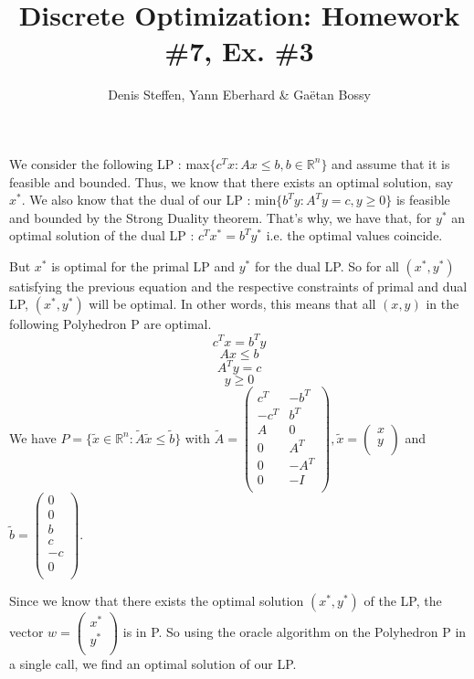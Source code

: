 \documentclass[a4paper,11pt,french]{article}
\title{Discrete Optimization: Homework \#7, Ex. \#3}
\author{Denis Steffen, Yann Eberhard \& Gaëtan Bossy}
\begin{document}
    
    \maketitle
   We consider the following LP :  max$\{ c^Tx : Ax \leq b, b\in \mathbb{R}^n \} $ and assume that it is feasible and bounded. Thus, we know that there exists an optimal solution, say $x^*$. 
   We also know that the dual of our LP : min$ \{ b^Ty : A^Ty = c, y \geq 0 \} $ is feasible and bounded by the Strong Duality theorem. That's why, we have that, for $y^*$ an optimal solution of the dual LP : 
   $c^Tx^* = b^Ty^*$ i.e. the optimal values coincide. 

   But $x^*$ is optimal for the primal LP and $y^*$ for the dual LP. So for all $(x^*, y^*)$ satisfying the previous equation and the respective constraints of primal and dual LP, $(x^*, y^*)$ will be optimal. 
   In other words, this means that all $(x, y)$ in the following Polyhedron P are optimal.
\begin{displaymath}
     c^Tx = b^Ty
    \end{displaymath} 
    \begin{displaymath}
       Ax \leq b
     \end{displaymath}
     \begin{displaymath}
      A^Ty = c
    \end{displaymath}
    \begin{displaymath}
      y \geq 0
    \end{displaymath}
    We have $ P = \{ \tilde{x} \in \mathbb{R}^n : \tilde{A} \tilde{x} \leq \tilde{b} \} $ with $\tilde{A} =  \begin{pmatrix}
       c^T & -b^T\\
      -c^T & b^T\\
      A & 0\\
      0 & A^T\\
      0 & -A^T\\
      0 & -I\\
    \end{pmatrix},
      \tilde{x} = 
    \left(\begin{array}{c}
      x\\
      y\\
    \end{array} \right)$ and $ \tilde{b} = \left( \begin{array}{c} 
    0\\
    0\\
    b\\
    c\\
    -c\\ 
    0\\
    \end{array} 
    \right).$ 


    \noindent Since we know that there exists the optimal solution $(x^*, y^*)$ of the LP, the vector $w = \left(\begin{array}{c}
    x^*\\
    y^*\\  
    \end{array}
   \right )$ is in P. So using the oracle algorithm on the Polyhedron P in a single call, we find an optimal solution of our LP.
  
  
\end{document}
